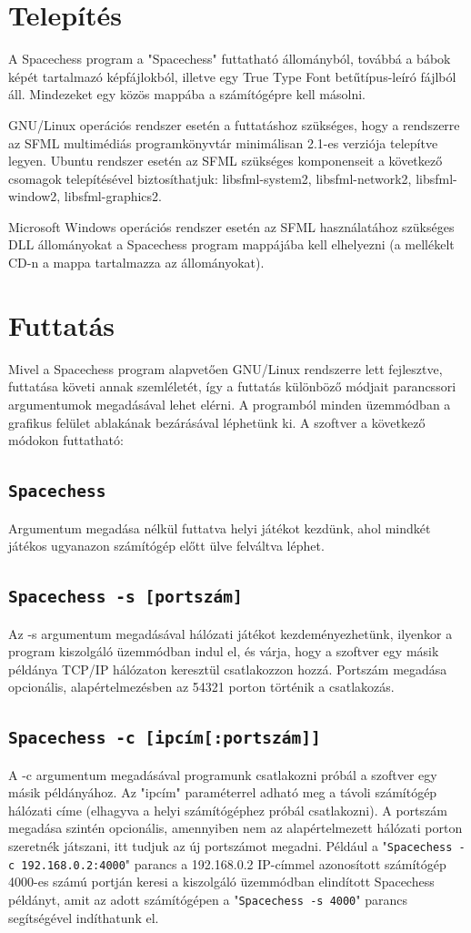 \documentclass[12pt, twoside]{report}
\begin{document}
\section{Telepítés}

A Spacechess program a "Spacechess" futtatható állományból, továbbá a bábok képét tartalmazó képfájlokból, illetve egy True Type Font betűtípus-leíró fájlból áll. Mindezeket egy közös mappába a számítógépre kell másolni. 

GNU/Linux operációs rendszer esetén a futtatáshoz szükséges, hogy a rendszerre az SFML multimédiás programkönyvtár minimálisan 2.1-es verziója telepítve legyen. Ubuntu rendszer esetén az SFML szükséges komponenseit a következő csomagok telepítésével biztosíthatjuk: libsfml-system2, libsfml-network2, libsfml-window2, libsfml-graphics2.

Microsoft Windows operációs rendszer esetén az SFML használatához szükséges DLL állományokat a Spacechess program mappájába kell elhelyezni (a mellékelt CD-n a mappa tartalmazza az állományokat). 

\section{Futtatás}	

Mivel a Spacechess program alapvetően GNU/Linux rendszerre lett fejlesztve, futtatása követi annak szemléletét, így a futtatás különböző módjait parancssori argumentumok megadásával lehet elérni. A programból minden üzemmódban a grafikus felület ablakának bezárásával léphetünk ki. A szoftver a következő módokon futtatható:
\subsection*{\tt Spacechess}
Argumentum megadása nélkül futtatva helyi játékot kezdünk, ahol mindkét játékos ugyanazon számítógép előtt ülve felváltva léphet.
\subsection*{\tt Spacechess -s [portszám]}
Az -s argumentum megadásával hálózati játékot kezdeményezhetünk, ilyenkor a program kiszolgáló üzemmódban indul el, és várja, hogy a szoftver egy másik példánya TCP/IP hálózaton keresztül csatlakozzon hozzá. Portszám megadása opcionális, a\-lap\-ér\-tel\-me\-zés\-ben az 54321 porton történik a csatlakozás.
\subsection*{\tt Spacechess -c [ipcím[:portszám]]}
A -c argumentum megadásával programunk csatlakozni próbál a szoftver egy másik példányához. Az "ipcím" paraméterrel adható meg a távoli számítógép hálózati címe (elhagyva a helyi számítógéphez próbál csatlakozni). A portszám megadása szintén opcionális, amennyiben nem az alapértelmezett hálózati porton szeretnék játszani, itt tudjuk az új portszámot megadni. Például a "{\tt Spacechess -c 192.168.0.2:4000}" parancs a 192.168.0.2 IP-címmel azonosított számítógép 4000-es számú portján keresi a kiszolgáló üzemmódban elindított Spacechess példányt, amit az adott számítógépen a "{\tt Spacechess -s 4000}" parancs segítségével indíthatunk el.
\end{document}
